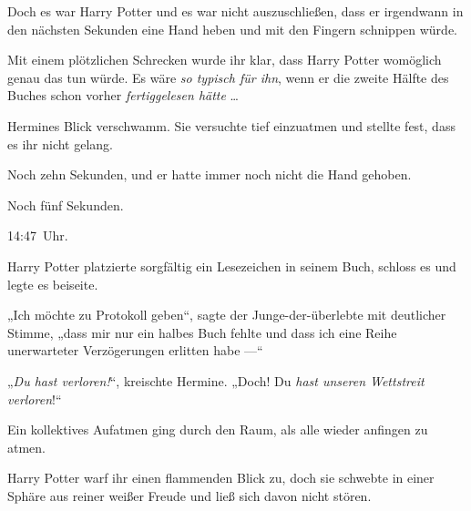 Doch es war Harry Potter und es war nicht auszuschließen, dass er irgendwann in den nächsten Sekunden eine Hand heben und mit den Fingern schnippen würde.

Mit einem plötzlichen Schrecken wurde ihr klar, dass Harry Potter womöglich genau das tun würde. Es wäre \emph{so typisch für ihn}, wenn er die zweite Hälfte des Buches schon vorher \emph{fertiggelesen hätte} …

Hermines Blick verschwamm. Sie versuchte tief einzuatmen und stellte fest, dass es ihr nicht gelang.

Noch zehn Sekunden, und er hatte immer noch nicht die Hand gehoben.

Noch fünf Sekunden.

14:47~Uhr.

Harry Potter platzierte sorgfältig ein Lesezeichen in seinem Buch, schloss es und legte es beiseite.

„Ich möchte zu Protokoll geben“, sagte der Junge-der-überlebte mit deutlicher Stimme, „dass mir nur ein halbes Buch fehlte und dass ich eine Reihe unerwarteter Verzögerungen erlitten habe —“

„\emph{Du hast verloren!}“, kreischte Hermine.
„Doch! Du \emph{hast unseren Wettstreit verloren}!“

Ein kollektives Aufatmen ging durch den Raum, als alle wieder anfingen zu atmen.

Harry Potter warf ihr einen flammenden Blick zu, doch sie schwebte in einer Sphäre aus reiner weißer Freude und ließ sich davon nicht stören.

